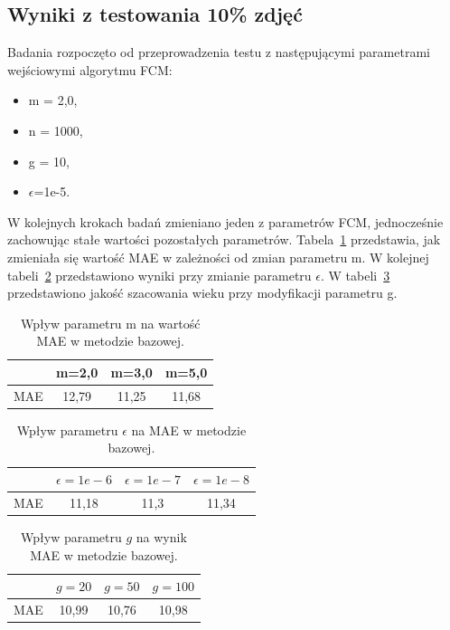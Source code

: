 \documentclass[a4paper,twoside,12pt]{book}
\begin{document}
    \subsection*{Wyniki z testowania 10\% zdjęć}
    Badania rozpoczęto od przeprowadzenia testu z następującymi parametrami wejściowymi algorytmu FCM:
    \begin{itemize}
        \item m = 2,0,
        \item n = 1000,
        \item g = 10,
        \item $\epsilon$=1e-5.
    \end{itemize}
    W kolejnych krokach badań zmieniano jeden z parametrów FCM, jednocześnie zachowując stałe wartości pozostałych
    parametrów.
    Tabela~\ref{tab.bazowa_m} przedstawia, jak zmieniała się wartość MAE w zależności od zmian parametru m.
    W kolejnej tabeli~\ref{tab.bazowa_e} przedstawiono wyniki przy
    zmianie parametru $\epsilon$.
    W tabeli~\ref{tab.bazowa_g} przedstawiono
    jakość szacowania
    wieku przy modyfikacji parametru g.
    \begin{table}[h!]
        \centering
        \caption{Wpływ parametru m na wartość MAE w metodzie bazowej.}
        \begin{tabular}{|c|c|c|c|}
            \hline
            & m=2,0 & m=3,0 & m=5,0 \\ \hline
            MAE & 12,79 & 11,25 & 11,68 \\ \hline
        \end{tabular}
        \label{tab.bazowa_m}
    \end{table}
    \begin{table}[h!]
        \centering
        \caption{Wpływ parametru $\epsilon$ na MAE w metodzie bazowej.}
        \begin{tabular}{|c|c|c|c|}
            \hline
            & $\epsilon=1e-6$ & $\epsilon=1e-7$ & $\epsilon=1e-8$ \\ \hline
            MAE & 11,18 & 11,3 & 11,34 \\ \hline
        \end{tabular}
        \label{tab.bazowa_e}
    \end{table}
    \begin{table}[h!]
        \centering
        \caption{Wpływ parametru $g$ na wynik MAE w metodzie bazowej.}
        \begin{tabular}{|c|c|c|c|}
            \hline
            & $g=20$ & $g=50$ & $g=100$ \\ \hline
            MAE & 10,99 & 10,76 & 10,98 \\ \hline
        \end{tabular}
        \label{tab.bazowa_g}
    \end{table}
\end{document}
